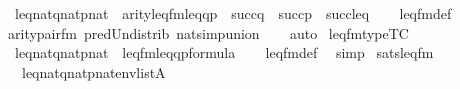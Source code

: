 \begin{isabellebody}
\ \ {\isachardoublequoteopen}{\isasymlbrakk}leq{\isasymin}nat{\isacharsemicolon}{\kern0pt}q{\isasymin}nat{\isacharsemicolon}{\kern0pt}p{\isasymin}nat{\isasymrbrakk}\ {\isasymLongrightarrow}\ arity{\isacharparenleft}{\kern0pt}leq{\isacharunderscore}{\kern0pt}fm{\isacharparenleft}{\kern0pt}leq{\isacharcomma}{\kern0pt}q{\isacharcomma}{\kern0pt}p{\isacharparenright}{\kern0pt}{\isacharparenright}{\kern0pt}\ {\isacharequal}{\kern0pt}\ succ{\isacharparenleft}{\kern0pt}q{\isacharparenright}{\kern0pt}\ {\isasymunion}\ succ{\isacharparenleft}{\kern0pt}p{\isacharparenright}{\kern0pt}\ {\isasymunion}\ succ{\isacharparenleft}{\kern0pt}leq{\isacharparenright}{\kern0pt}{\isachardoublequoteclose}\isanewline
%
\isadelimproof
\ \ %
\endisadelimproof
%
\isatagproof
{}\isamarkupfalse%
\ leq{\isacharunderscore}{\kern0pt}fm{\isacharunderscore}{\kern0pt}def\isanewline
\ \ \isamarkupfalse%
\ arity{\isacharunderscore}{\kern0pt}pair{\isacharunderscore}{\kern0pt}fm\ pred{\isacharunderscore}{\kern0pt}Un{\isacharunderscore}{\kern0pt}distrib\ nat{\isacharunderscore}{\kern0pt}simp{\isacharunderscore}{\kern0pt}union\isanewline
\ \ \isamarkupfalse%
\ auto%
\endisatagproof
{\isafoldproof}%
%
\isadelimproof
\isanewline
%
\endisadelimproof
\isanewline
{}\isamarkupfalse%
\ leq{\isacharunderscore}{\kern0pt}fm{\isacharunderscore}{\kern0pt}type{\isacharbrackleft}{\kern0pt}TC{\isacharbrackright}{\kern0pt}\ {\isacharcolon}{\kern0pt}\isanewline
\ \ {\isachardoublequoteopen}{\isasymlbrakk}leq{\isasymin}nat{\isacharsemicolon}{\kern0pt}q{\isasymin}nat{\isacharsemicolon}{\kern0pt}p{\isasymin}nat{\isasymrbrakk}\ {\isasymLongrightarrow}\ leq{\isacharunderscore}{\kern0pt}fm{\isacharparenleft}{\kern0pt}leq{\isacharcomma}{\kern0pt}q{\isacharcomma}{\kern0pt}p{\isacharparenright}{\kern0pt}{\isasymin}formula{\isachardoublequoteclose}\isanewline
%
\isadelimproof
\ \ %
\endisadelimproof
%
\isatagproof
{}\isamarkupfalse%
\ leq{\isacharunderscore}{\kern0pt}fm{\isacharunderscore}{\kern0pt}def\ \isamarkupfalse%
\ simp%
\endisatagproof
{\isafoldproof}%
%
\isadelimproof
\isanewline
%
\endisadelimproof
\isanewline
{}\isamarkupfalse%
\ sats{\isacharunderscore}{\kern0pt}leq{\isacharunderscore}{\kern0pt}fm\ {\isacharcolon}{\kern0pt}\isanewline
\ \ {\isachardoublequoteopen}{\isasymlbrakk}\ leq{\isasymin}nat{\isacharsemicolon}{\kern0pt}q{\isasymin}nat{\isacharsemicolon}{\kern0pt}p{\isasymin}nat{\isacharsemicolon}{\kern0pt}env{\isasymin}list{\isacharparenleft}{\kern0pt}A{\isacharparenright}{\kern0pt}\ {\isasymrbrakk}\ {\isasymLongrightarrow}\isanewline

\end{isabellebody}
